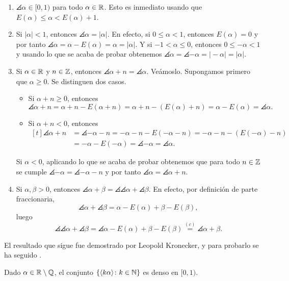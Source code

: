 \documentclass[a4paper, 12pt]{book}
\begin{document}
\begin{enumerate}
    \item $\angles{\alpha} \in [0,1)$ para todo $\alpha\in\mathbb R$. Esto es inmediato usando que $E(\alpha) \leq \alpha < E(\alpha)+1$.
    \item Si $|\alpha| < 1$, entonces $\angles{\alpha}=|\alpha| $. En efecto, si $0 \leq \alpha < 1$, entonces $E(\alpha) = 0$ y por tanto $\angles{\alpha} = \alpha - E(\alpha) = \alpha = |\alpha|$. Y si $-1 < \alpha \leq 0$, entonces $0\leq -\alpha < 1$ y usando lo que se acaba de probar obtenemos $\angles{\alpha} = \angles{-\alpha} = |\!-\alpha| = |\alpha|$.
    \item Si $\alpha\in\mathbb R$ y $n \in \mathbb Z$, entonces $\angles{\alpha+n} = \angles{\alpha}$. Veámoslo. Supongamos primero que $\alpha \geq 0$. Se distinguen dos casos.
    \begin{itemize}
        \item Si $\alpha+n \geq 0$, entonces
        \[\angles{\alpha+n} = \alpha+n-E(\alpha+n) = \alpha+n-(E(\alpha)+n) = \alpha-E(\alpha) = \angles{\alpha}.\]
        \item Si $\alpha+n < 0$, entonces
        \[
        \begin{aligned}[t]
            \angles{\alpha+n} &= \angles{-\alpha-n} = -\alpha-n-E(-\alpha-n) = -\alpha-n-(E(-\alpha)-n) \\ &= -\alpha-E(-\alpha) = \angles{-\alpha} = \angles{\alpha}.
        \end{aligned}
        \]
    \end{itemize}
    Si $\alpha < 0$, aplicando lo que se acaba de probar obtenemos que para todo $n \in \mathbb Z$ se cumple $\angles{-\alpha} = \angles{-\alpha-n}$ y por tanto $\angles{\alpha} = \angles{\alpha+n}$.
    \item Si $\alpha,\beta > 0$, entonces $\angles{\alpha+\beta} = \angles{\angles{\alpha}+\angles{\beta}}$. En efecto, por definición de parte fraccionaria,
    \[\angles{\alpha}+\angles{\beta} = \alpha-E(\alpha)+\beta-E(\beta),\]
    luego
    \[\angles{\angles{\alpha}+\angles{\beta}} = \angles{\alpha-E(\alpha)+\beta-E(\beta)} \overset{(c)}{=} \angles{\alpha+\beta}.\]
\end{enumerate}

El resultado que sigue fue demostrado por Leopold Kronecker, y para probarlo se ha seguido \cite{schmidt}.

\begin{lemma}\label{2.2.3}
    Dado $\alpha \in \mathbb R \setminus \mathbb Q$, el conjunto $\{\langle k\alpha \rangle \colon k \in \mathbb N\}$ es denso en $[0,1)$.
\end{lemma}
\end{document}
